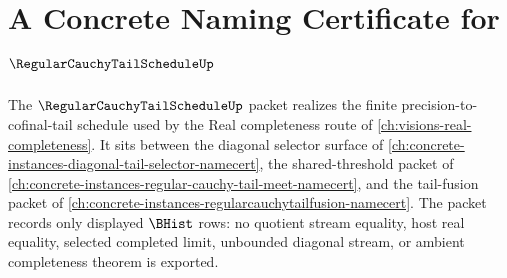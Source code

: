 \chapter{A Concrete Naming Certificate for $\RegularCauchyTailScheduleUp$}
\label{ch:concrete-instances-regularcauchytailschedule-namecert}

The $\RegularCauchyTailScheduleUp$ packet realizes the finite precision-to-cofinal-tail schedule used by the Real completeness route of \autoref{ch:visions-real-completeness}. It sits between the diagonal selector surface of \autoref{ch:concrete-instances-diagonal-tail-selector-namecert}, the shared-threshold packet of \autoref{ch:concrete-instances-regular-cauchy-tail-meet-namecert}, and the tail-fusion packet of \autoref{ch:concrete-instances-regularcauchytailfusion-namecert}. The packet records only displayed $\BHist$ rows: no quotient stream equality, host real equality, selected completed limit, unbounded diagonal stream, or ambient completeness theorem is exported.

